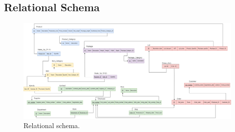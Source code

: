 \subsection{Relational Schema}
\begin{figure}[!h]
	\centering
	\includegraphics[width=1.3\linewidth,angle=270,origin=c]{Relational.png}
	\caption{Relational schema.}
	\label{fig:relational-schema}
\end{figure}
